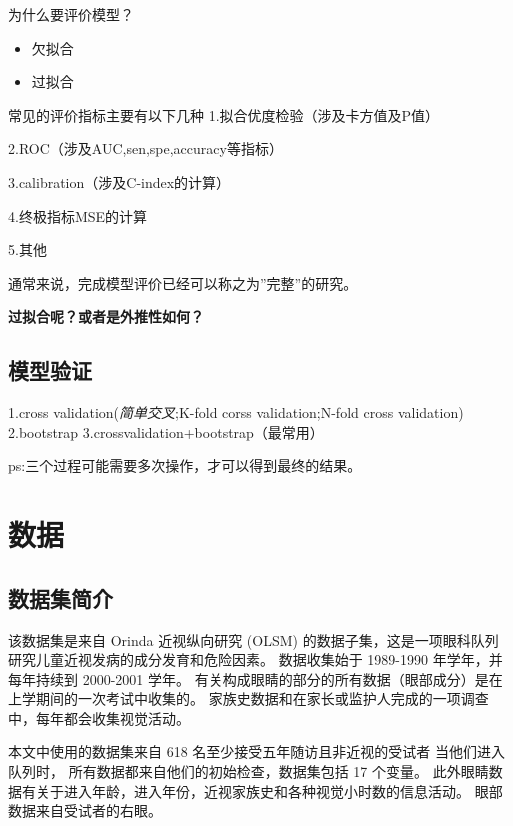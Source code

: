 \documentclass[]{ctexbook}
\providecommand{\tightlist}{%
  \setlength{\itemsep}{0pt}\setlength{\parskip}{0pt}}
\begin{document}
为什么要评价模型？

\begin{itemize}
\tightlist
\item
  欠拟合
\item
  过拟合
\end{itemize}

常见的评价指标主要有以下几种
1.拟合优度检验（涉及卡方值及P值）

2.ROC（涉及AUC,sen,spe,accuracy等指标）

3.calibration（涉及C-index的计算）

4.终极指标MSE的计算

5.其他

通常来说，完成模型评价已经可以称之为''完整''的研究。

\textbf{过拟合呢？或者是外推性如何？}

\hypertarget{ux6a21ux578bux9a8cux8bc1}{%
\section{模型验证}\label{ux6a21ux578bux9a8cux8bc1}}

1.cross validation(\emph{简单交叉};K-fold corss validation;N-fold cross validation)
2.bootstrap
3.crossvalidation+bootstrap（最常用）

ps:三个过程可能需要多次操作，才可以得到最终的结果。

\hypertarget{ux6570ux636e}{%
\chapter{数据}\label{ux6570ux636e}}

\hypertarget{ux6570ux636eux96c6ux7b80ux4ecb}{%
\section{数据集简介}\label{ux6570ux636eux96c6ux7b80ux4ecb}}

该数据集是来自 Orinda 近视纵向研究 (OLSM) 的数据子集，这是一项眼科队列研究儿童近视发病的成分发育和危险因素。 数据收集始于 1989-1990 年学年，并每年持续到 2000-2001 学年。 有关构成眼睛的部分的所有数据（眼部成分）是在上学期间的一次考试中收集的。 家族史数据和在家长或监护人完成的一项调查中，每年都会收集视觉活动。

本文中使用的数据集来自 618 名至少接受五年随访且非近视的受试者
当他们进入队列时， 所有数据都来自他们的初始检查，数据集包括 17 个变量。 此外眼睛数据有关于进入年龄，进入年份，近视家族史和各种视觉小时数的信息活动。 眼部数据来自受试者的右眼。
\end{document}
